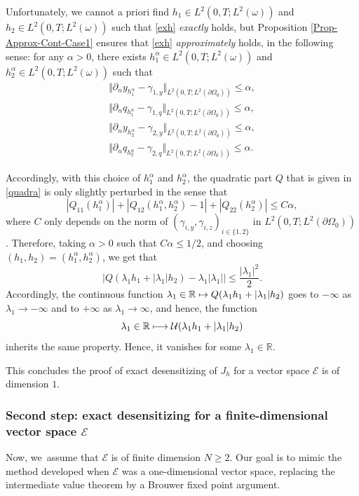 \documentclass[JEP,XML,SOM,Unicode,NoFloatCountersInSection]{cedram}
\newcommand\mto{\mathchoice{\longmapsto}{\mapsto}{\mapsto}{\mapsto}}
\newcommand\R{{\mathbb R}}
\newcommand{\norm}[1]{\Vert#1\Vert}
\theoremstyle{definition}
\begin{document}
Unfortunately, we cannot a priori find $h_1\!\in\! L^2(0,T; L^2(\omega))$ and $h_2\!\in\! L^2(0,T; L^2(\omega))$ such that \eqref{exh} \textit{exactly} holds, but Proposition \ref{Prop-Approx-Cont-Case1} ensures that \eqref{exh} \textit{approximately} holds, in the following sense: for any ${\alpha}>0$, there exists $h_1^{\alpha} \in L^2(0,T; L^2(\omega))$ and $h_2^{\alpha} \in L^2(0,T; L^2(\omega))$ such that
\begin{equation*}
\begin{aligned}
\norm{\partial_{n} y_{h_1^{\alpha}}-\gamma_{1,y}}_{L^2(0,T; L^2(\partial \Omega_0))}\leqslant {\alpha},
\\
\norm{\partial_{n} q_{h_1^{\alpha}}-\gamma_{1,q}}_{L^2(0,T; L^2(\partial \Omega_0))}\leqslant {\alpha},
\\
\norm{\partial_{n} y_{h_2^{\alpha}}-\gamma_{2,y}}_{L^2(0,T; L^2(\partial \Omega_0))}\leqslant {\alpha},
\\
\norm{\partial_{n} q_{h_2^{\alpha}}-\gamma_{2,q}}_{L^2(0,T; L^2(\partial \Omega_0))}\leqslant {\alpha}.
\end{aligned}
\end{equation*}

Accordingly, with this choice of $h_1^{\alpha}$ and $h_2^{\alpha}$, the quadratic part $Q$ that is given in \eqref{quadra} is only slightly perturbed in the sense that
\[
|Q_{11}(h_1^{\alpha})| +|Q_{12}(h_1^{\alpha},h_2^{\alpha}) -1| + |Q_{22} (h_2^{\alpha})| \leq C {\alpha},
\]
where $C$ only depends on the norm of $(\gamma_{i,y}, \gamma_{i,z})_{i \in \{1,2\}}$ in $L^2(0,T; L^2(\partial \Omega_0))$. Therefore, taking ${\alpha} >0$ such that $C {\alpha} \leq 1/2$, and choosing $(h_1, h_2) = (h_1^{\alpha}, h_2^{\alpha})$, we get that
\[
|Q(\lambda_1h_1 +|\lambda_1|h_2) - \lambda_1 |\lambda_1| | \leq \frac{|\lambda_1|^2}{2}.
\]
Accordingly, the continuous function $\lambda_1 \in \R \mto Q(\lambda_1h_1 +|\lambda_1|h_2)$ goes to $-\infty$ as $\lambda_1 \to -\infty$ and to $+ \infty$ as $\lambda_1 \to \infty$, and hence, the function
\[
\lambda_1 \in \R \mto \mathcal{U}(\lambda_1 h_1+|\lambda_1| h_2)
\]
inherits the same property. Hence, it vanishes for some $\lambda_1 \in \R$.

This concludes the proof of exact desensitizing of $J_h$ for a vector space $\mathcal{E}$ is of dimension $1$.

\subsubsection*{Second step: exact desensitizing for a finite-dimensional vector space $\mathcal{E}$} Now, we~assu\-me that $\mathcal{E}$ is of finite dimension $N\geqslant 2$. Our goal is to mimic the method developed when $\mathcal{E}$ was a one-dimensional vector space, replacing the intermediate value theorem by a Brouwer fixed point argument.
\end{document}
